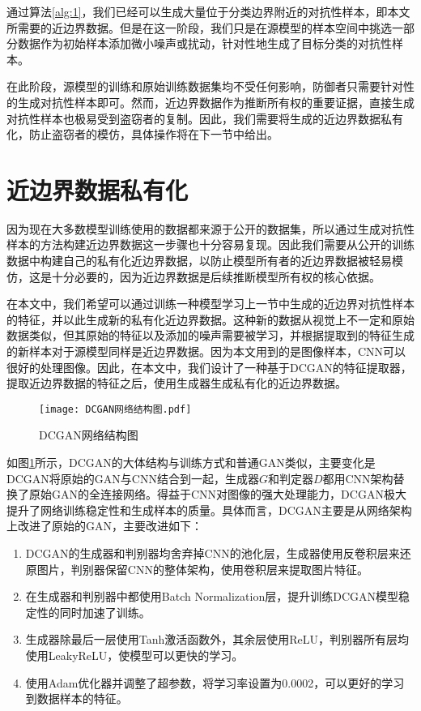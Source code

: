 通过算法\ref{alg:1}，我们已经可以生成大量位于分类边界附近的对抗性样本，即本文所需要的近边界数据。但是在这一阶段，我们只是在源模型的样本空间中挑选一部分数据作为初始样本添加微小噪声或扰动，针对性地生成了目标分类的对抗性样本。

在此阶段，源模型的训练和原始训练数据集均不受任何影响，防御者只需要针对性的生成对抗性样本即可。然而，近边界数据作为推断所有权的重要证据，直接生成对抗性样本也极易受到盗窃者的复制。因此，我们需要将生成的近边界数据私有化，防止盗窃者的模仿，具体操作将在下一节中给出。

\section{近边界数据私有化}\label{3.3}

因为现在大多数模型训练使用的数据都来源于公开的数据集，所以通过生成对抗性样本的方法构建近边界数据这一步骤也十分容易复现。因此我们需要从公开的训练数据中构建自己的私有化近边界数据，以防止模型所有者的近边界数据被轻易模仿，这是十分必要的，因为近边界数据是后续推断模型所有权的核心依据。

在本文中，我们希望可以通过训练一种模型学习上一节中生成的近边界对抗性样本的特征，并以此生成新的私有化近边界数据。这种新的数据从视觉上不一定和原始数据类似，但其原始的特征以及添加的噪声需要被学习，并根据提取到的特征生成的新样本对于源模型同样是近边界数据。因为本文用到的是图像样本，CNN可以很好的处理图像。因此，在本文中，我们设计了一种基于DCGAN\cite{radford2015unsupervised}的特征提取器，提取近边界数据的特征之后，使用生成器生成私有化的近边界数据。

\begin{figure}[htbp]%
	\centering
	\texttt{[image: DCGAN网络结构图.pdf]}
	\setlength{\abovecaptionskip}{5mm} %
	\caption{DCGAN网络结构图}
	\label{DCGAN网络结构图}
\end {figure}

如图\ref{DCGAN网络结构图}所示，DCGAN的大体结构与训练方式和普通GAN类似，主要变化是DCGAN将原始的GAN与CNN结合到一起，生成器$G$和判定器$D$都用CNN架构替换了原始GAN的全连接网络。得益于CNN对图像的强大处理能力，DCGAN极大提升了网络训练稳定性和生成样本的质量。具体而言，DCGAN主要是从网络架构上改进了原始的GAN，主要改进如下：

\begin{enumerate}
	\renewcommand{\labelenumi}{\theenumi)}
	\item DCGAN的生成器和判别器均舍弃掉CNN的池化层，生成器使用反卷积层来还原图片，判别器保留CNN的整体架构，使用卷积层来提取图片特征。
	\item 在生成器和判别器中都使用Batch Normalization层，提升训练DCGAN模型稳定性的同时加速了训练。
	\item 生成器除最后一层使用Tanh激活函数外，其余层使用ReLU，判别器所有层均使用LeakyReLU，使模型可以更快的学习。
	\item 使用Adam优化器并调整了超参数，将学习率设置为0.0002，可以更好的学习到数据样本的特征。
\end{enumerate}

